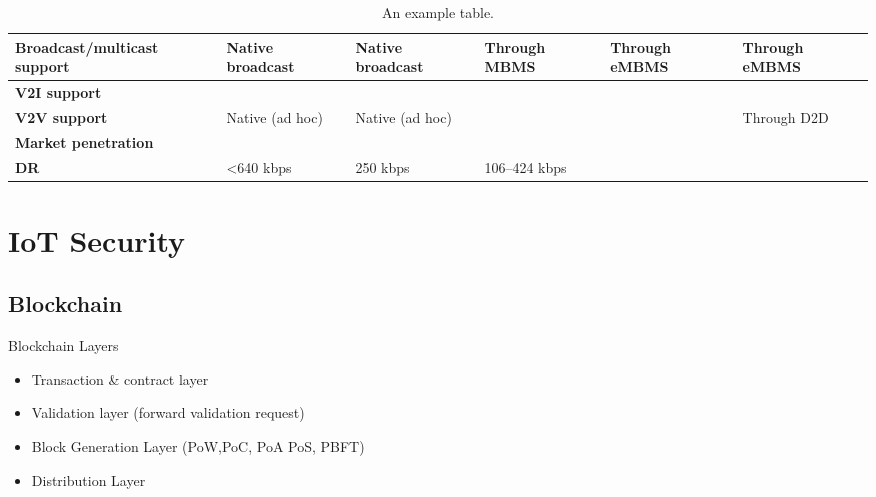 \begin{table}[h!]
\begin{tabulary}{\textwidth}{L|L|L|L|L|L}
	\bf{Broadcast/multicast support} & Native broadcast                                      & Native broadcast                                      & Through MBMS                     & Through eMBMS            & Through eMBMS             \\\hline
	\bf{V2I support}                 & \ok                                                   & \ok                                                   & \ok                              & \ok                      & \ok                       \\\hline
	\bf{V2V support}                 & Native (ad hoc)                                       & Native (ad hoc)                                       & \ko                              & \ko                      & Through D2D               \\\hline
	\bf{Market penetration}          & \ok                                                   & \ko                                                   & \ok                              & \ok                      & \ok                       \\\hline
	\bf{\ac{DR}}                   & <640 kbps                                        & 250 kbps                                              & 106–424 kbps                              & \ok                      & \ok                       \\\hline
	\end{tabulary}
	\caption{\label{tab:Tableppp} An example table.}
\end{table}

\section{IoT Security}

\subsection{Blockchain}

Blockchain Layers
\begin{itemize}
	\item Transaction \& contract layer
	\item Validation layer (forward validation request)
	\item Block Generation Layer (PoW,PoC, PoA PoS, PBFT)
	\item Distribution Layer
	\\
\end{itemize}

